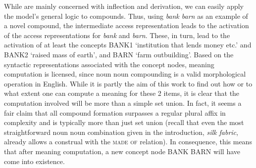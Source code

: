 While \citet{SchreuderandBaayen:1995} are mainly concerned with
inflection and derivation, we can easily apply the model's general logic to
compounds. Thus, using \emph{bank barn} as an example of a novel
compound, the intermediate access representation %
\textipa{[""b\ae NkbA:n]}
leads to the activation of the access representations for \emph{bank} and
\emph{barn}. These, in turn, lead to the activation of at least the
concepts BANK1 `institution that lends money etc.' and BANK2 `raised mass of earth', and BARN `farm outbuilding'. 
Based on the syntactic representations associated with the concept
nodes, meaning computation is licensed, since noun noun compounding is a 
 valid morphological operation in English. While it is partly the aim
of this work to find out how or to what extent one can compute a meaning
for these 2 items, it is clear that the computation involved will be
more than a simple set union. In fact, it seems a fair claim that all
compound formation surpasses a regular plural affix in complexity and
is typically more than just set union (recall that even the most
straightforward noun noun combination given in the introduction,
\emph{silk fabric}, already allows a construal with the \textsc{made of} relation). In consequence, this means that
after meaning computation, a new concept node BANK BARN will have come
into existence.



    
  




